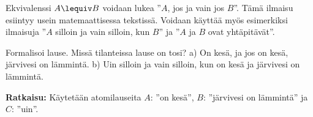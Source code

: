 \bigskip

Ekvivalenssi $A\lequiv B$ voidaan lukea ''$A$, jos ja vain jos $B$''. Tämä ilmaisu esiintyy usein matemaattisessa tekstissä. Voidaan käyttää myös esimerkiksi ilmaisuja ''$A$ silloin ja vain silloin, kun $B$'' ja ''$A$ ja $B$ ovat yhtäpitävät''.


\begin{esimerkki}
Formalisoi lause. Missä tilanteissa lause on tosi? a) On kesä, ja jos on kesä, järvivesi on lämmintä. b) Uin silloin ja vain silloin, kun on kesä ja järvivesi on lämmintä. 

{\bf Ratkaisu:}
Käytetään atomilauseita $A$: ''on kesä'',
$B$: ''järvivesi on lämmintä'' ja $C$: ''uin''.
\end{esimerkki}

